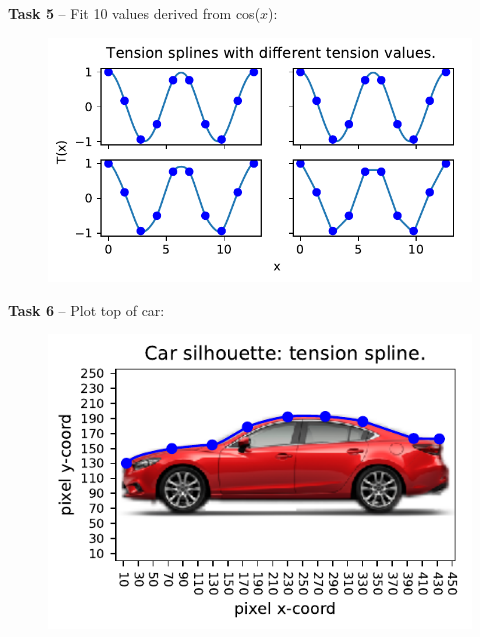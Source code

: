 \documentclass{article}
\newcommand{\T}[2]{\textbf{Task #1} -- #2:\\}
\begin{document}
\T{5}{Fit 10 values derived from cos($x$)}

  \begin{figure}[!ht]
    \center
    \includegraphics{figs/p2-fit-10-points.pdf}
  \end{figure}

\T{6}{Plot top of car}

  \begin{figure}[!ht]
    \center
    \includegraphics{figs/p2-car-tension-splines.pdf}
  \end{figure}
\end{document}
